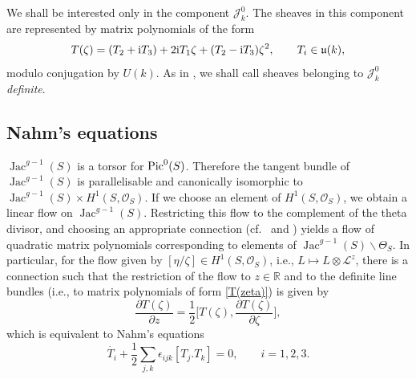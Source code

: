 \documentclass[10pt,a4paper]{amsart}
\renewcommand{\u}{{\mathfrak u}}
\newcommand{\Jac}{\operatorname{Jac}}
\numberwithin{equation}{section}
\newcommand{\oR}{{\mathbb{R}}}
\newcommand{\sO}{{\mathcal{O}}}
\begin{document}
We shall be interested only in the component $\mathscr{J}_k^0$. The sheaves in this component are represented by matrix polynomials of the form
\begin{equation}
T(\zeta)=(T_2+{\rm i} T_3)+2{\rm i} T_1\zeta+(T_2-{\rm i} T_3)\zeta^2,\qquad T_i\in\u(k),\label{T(zeta)}
\end{equation}
modulo conjugation by $U(k)$.
As in \cite{theta}, we shall call sheaves belonging to $\mathscr{J}_k^0$ {\em definite}.

\subsection{Nahm's equations}
$\Jac^{g-1}(S)$ is a torsor for ${\rm Pic}^0(S)$. Therefore the tangent bundle of $\Jac^{g-1}(S)$ is parallelisable and canonically isomorphic to $ \Jac^{g-1}(S)\times H^1(S,\sO_S)$. If we choose an element of $ H^1(S,\sO_S)$, we obtain a linear flow on $\Jac^{g-1}(S)$. Restricting this flow to the complement of the theta divisor, and choosing an appropriate connection (cf.\ \cite{Hit} and \cite{AHH}) yields a flow of quadratic matrix polynomials corresponding to elements of $\Jac^{g-1}(S)\backslash \Theta_S$. In particular, for the flow given by $[\eta/\zeta]\in H^1(S,\sO_S)$, i.e., $L\mapsto L\otimes \mathscr{L}^z$, there is a connection such that the restriction of the flow to $z\in \oR$ and to the definite line bundles
(i.e., to matrix polynomials of form \eqref{T(zeta)}) is given by
\begin{equation*}
\frac{\partial T(\zeta)}{\partial z}=\frac{1}{2}\bigg[T(\zeta),\frac{\partial T(\zeta)}{\partial \zeta}\bigg],%
\end{equation*}
which is equivalent to Nahm's equations
\begin{equation}\label{eq:Nahm}
\dot{T_i}+\frac{1}{2}\sum_{j,k}\epsilon_{ijk}[T_j.T_k]=0,\qquad
i=1,2,3.
\end{equation}
\end{document}
